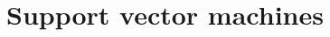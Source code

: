 \documentclass[12pt, twoside, a4paper]{report}
\begin{document}

\section{Support vector machines}
\label{bg:svm}
\end{document}
